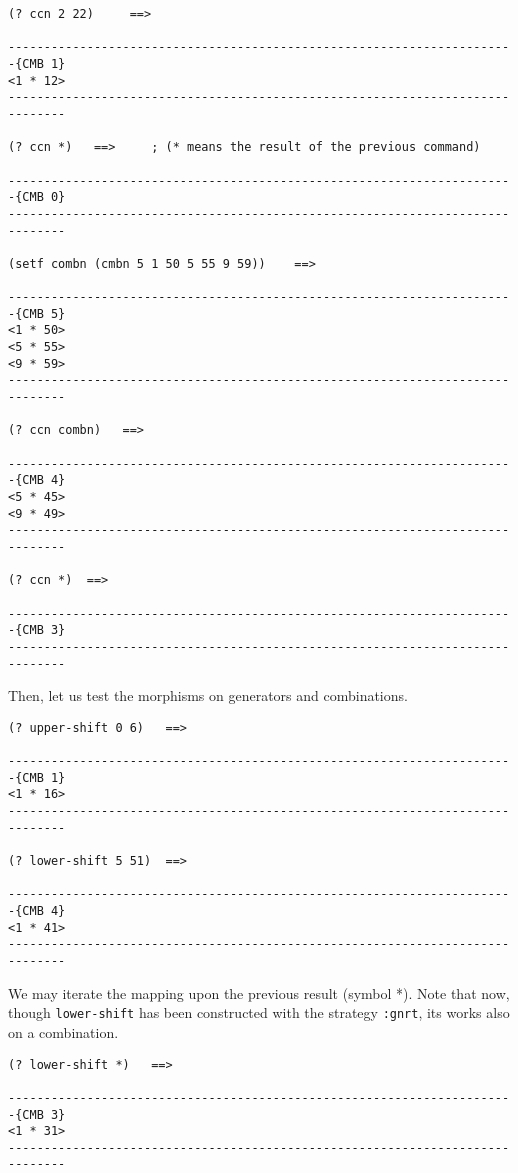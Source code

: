 {\footnotesize\begin{verbatim}
(? ccn 2 22)     ==>

-----------------------------------------------------------------------{CMB 1}
<1 * 12>
------------------------------------------------------------------------------

(? ccn *)   ==>     ; (* means the result of the previous command)

-----------------------------------------------------------------------{CMB 0}
------------------------------------------------------------------------------

(setf combn (cmbn 5 1 50 5 55 9 59))    ==>

-----------------------------------------------------------------------{CMB 5}
<1 * 50>
<5 * 55>
<9 * 59>
------------------------------------------------------------------------------

(? ccn combn)   ==>

-----------------------------------------------------------------------{CMB 4}
<5 * 45>
<9 * 49>
------------------------------------------------------------------------------

(? ccn *)  ==>

-----------------------------------------------------------------------{CMB 3}
------------------------------------------------------------------------------
\end{verbatim}}
Then, let us test the morphisms on generators and combinations.
{\footnotesize\begin{verbatim}
(? upper-shift 0 6)   ==>

-----------------------------------------------------------------------{CMB 1}
<1 * 16>
------------------------------------------------------------------------------

(? lower-shift 5 51)  ==>

-----------------------------------------------------------------------{CMB 4}
<1 * 41>
------------------------------------------------------------------------------
\end{verbatim}}
We may iterate the mapping  upon the previous result (symbol *).
Note that now, though {\tt lower-shift} has been constructed with
the strategy {\tt :gnrt}, its works also on a combination.
{\footnotesize\begin{verbatim}
(? lower-shift *)   ==>

-----------------------------------------------------------------------{CMB 3}
<1 * 31>
------------------------------------------------------------------------------
\end{verbatim}}

